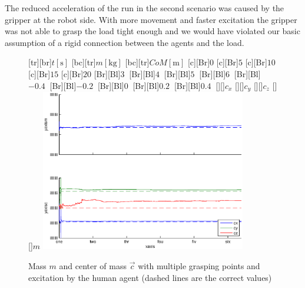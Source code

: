 The reduced acceleration of the run in the second scenario was caused by the gripper at the robot side. With more movement and faster excitation the gripper was not able to grasp the load tight enough and we would have violated our basic assumption of a rigid connection between the agents and the load.

\begin{figure}
	\centering	
	[tr][br]{$t\left[\mathrm{s}\right]$}
	[bc][tr]{$m\left[\mathrm{kg}\right]$}
	[bc][tr]{$CoM\left[\mathrm{m}\right]$}
	[Br]{$0$}
	[Br]{$5$}
	[Br]{$10$}
	[Br]{$15$}
	[Br]{$20$}
	[Br][Bl]{$3\  $}
	[Br][Bl]{$4\ $}
	[Br][Bl]{$5\  $}
	[Br][Bl]{$6\  $}
	[Br][Bl]{$-0.4\  $}
	[Br][Bl]{$-0.2\ $}
	[Br][Bl]{$0\  $}
	[Br][Bl]{$0.2\  $}
	[Br][Bl]{$0.4\  $}
	[][]{\tiny $c_x$}
	[][]{\tiny $c_y$}
	[][]{\tiny $c_z$}
	[][]{\tiny $m$}
	\includegraphics[width=0.8\textwidth]{figures/multiple_grasping_points_human_mass_and_cog.eps}
	\vspace{0.2cm}
	\caption[Mass error, multiple grasping points, excitation by human agent]{Mass $m$ and center of mass $\vec{c}$ with multiple grasping points and excitation by the human agent (dashed lines are the correct values)}
	\label{fig:estim_mass_multi_human}
\end{figure}

